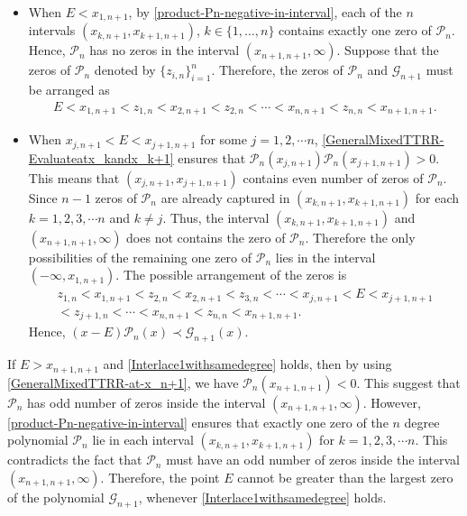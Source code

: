 \documentclass[final,3p,times,12pt]{elsarticle}
\numberwithin{equation}{section}  %
\begin{document}
\begin{enumerate}
	
	\begin{itemize}
		\item When $E < x_{1,n+1}$, by \eqref{product-Pn-negative-in-interval}, each of the $n$ intervals $(x_{k,n+1}, x_{k+1,n+1})$, $k\in\{1,\dots,n\}$ contains exactly one zero of $\mathcal{P}_n$. Hence, $\mathcal{P}_n$ has no zeros in the interval $(x_{n+1,n+1}, \infty)$. Suppose that the zeros of $\mathcal{P}_n$ denoted by $\{z_{i,n}\}_{i=1}^n$. Therefore, the zeros of $\mathcal{P}_n$ and $\mathcal{G}_{n+1}$ must be arranged as  
		\begin{align}
			E < x_{1,n+1} < z_{1,n} < x_{2,n+1} < z_{2,n} < \cdots < x_{n,n+1} < z_{n,n} < x_{n+1,n+1}.
		\end{align}
		\item When $x_{j,n+1}<E< x_{j+1,n+1}$ for some $j=1,2,\cdots n$,  \eqref{GeneralMixedTTRR-Evaluateatx_kandx_k+1} ensures that $\mathcal{P}_n(x_{j,n+1})	\mathcal{P}_n(x_{j+1,n+1})>0$.  This means that  $(x_{j,n+1}, x_{j+1,n+1})$ contains even number of zeros of  $\mathcal{P}_n$. Since $n-1$ zeros of $\mathcal{P}_n$ are already captured in $(x_{k,n+1}, x_{k+1,n+1})$ for each $k=1,2,3, \cdots n$ and $k\neq j$. Thus, the interval $(x_{k,n+1}, x_{k+1,n+1})$ and $(x_{n+1,n+1}, \infty)$ does not contains the zero of $\mathcal{P}_n$. Therefore the only possibilities of the remaining one zero of $\mathcal{P}_n$ lies in the interval $(-\infty, x_{1,n+1})$. The possible arrangement of the zeros is
		\begin{align}
			\nonumber	z_{1,n}<x_{1,n+1}<z_{2,n}<x_{2,n+1}<z_{3,n}<\cdots< x_{j,n+1}<E<x_{j+1,n+1}
			\\<z_{j+1,n}<\cdots<x_{n,n+1}<z_{n,n}<x_{n+1,n+1}.
		\end{align}
		Hence, $(x-E)\mathcal{P}_n(x)\prec\mathcal{G}_{n+1}(x)$.
	\end{itemize}
	If  $E>x_{n+1,n+1}$ and  \eqref{Interlace1withsamedegree} holds, then by using \eqref{GeneralMixedTTRR-at-x_n+1}, we have  $\mathcal{P}_n(x_{n+1,n+1})<0$. This suggest that $\mathcal{P}_n$ has odd number of zeros inside the interval $(x_{n+1,n+1}, \infty)$. However, \eqref{product-Pn-negative-in-interval} ensures that exactly one zero of the $n$ degree polynomial $\mathcal{P}_n$ lie in each interval $(x_{k,n+1}, x_{k+1,n+1})$ for $k=1,2,3, \cdots n$. This contradicts the fact that $\mathcal{P}_n$ must have an odd number of zeros inside the interval $(x_{n+1,n+1}, \infty)$. Therefore, the point $E$ cannot be greater than the largest zero of the polynomial $\mathcal{G}_{n+1}$, whenever \eqref{Interlace1withsamedegree} holds. 	

\end{enumerate}
\end{document}
